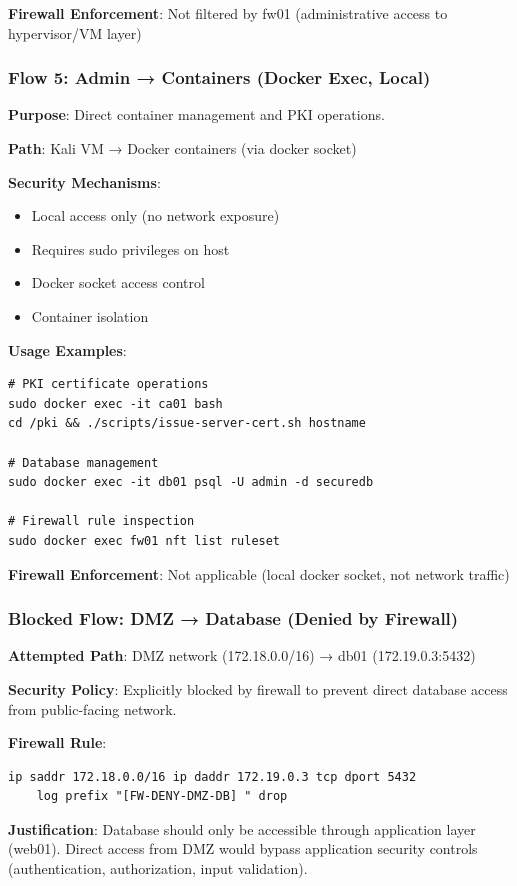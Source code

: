 \textbf{Firewall Enforcement}: Not filtered by fw01 (administrative access to hypervisor/VM layer)

\subsubsection{Flow 5: Admin → Containers (Docker Exec, Local)}

\textbf{Purpose}: Direct container management and PKI operations.

\textbf{Path}: Kali VM → Docker containers (via docker socket)

\textbf{Security Mechanisms}:
\begin{itemize}
    \item Local access only (no network exposure)
    \item Requires sudo privileges on host
    \item Docker socket access control
    \item Container isolation
\end{itemize}

\textbf{Usage Examples}:
\begin{verbatim}
# PKI certificate operations
sudo docker exec -it ca01 bash
cd /pki && ./scripts/issue-server-cert.sh hostname

# Database management
sudo docker exec -it db01 psql -U admin -d securedb

# Firewall rule inspection
sudo docker exec fw01 nft list ruleset
\end{verbatim}

\textbf{Firewall Enforcement}: Not applicable (local docker socket, not network traffic)

\subsubsection{Blocked Flow: DMZ → Database (Denied by Firewall)}

\textbf{Attempted Path}: DMZ network (172.18.0.0/16) → db01 (172.19.0.3:5432)

\textbf{Security Policy}: Explicitly blocked by firewall to prevent direct database access from public-facing network.

\textbf{Firewall Rule}:
\begin{verbatim}
ip saddr 172.18.0.0/16 ip daddr 172.19.0.3 tcp dport 5432 
    log prefix "[FW-DENY-DMZ-DB] " drop
\end{verbatim}

\textbf{Justification}: Database should only be accessible through application layer (web01). Direct access from DMZ would bypass application security controls (authentication, authorization, input validation).

